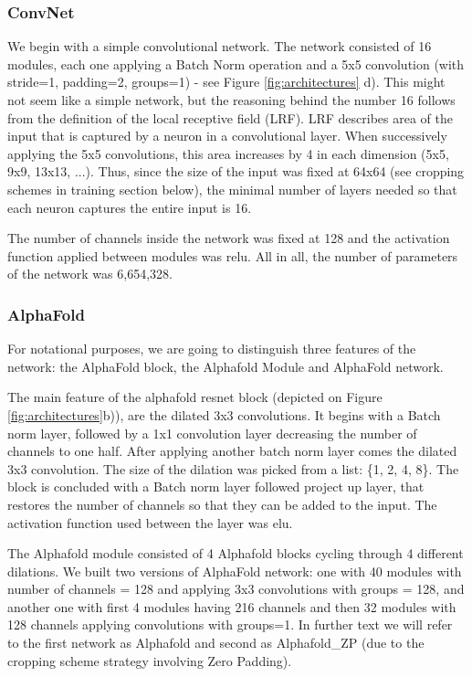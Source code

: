 \subsubsection{ConvNet}

We begin with a simple convolutional network. The network consisted of 16 modules, each one applying a Batch Norm operation and a 5x5 convolution (with stride=1, padding=2, groups=1) - see Figure \ref{fig:architectures} d). This might not seem like a simple network, but the reasoning behind the number 16 follows from the definition of the local receptive field (LRF). LRF describes area of the input that is captured by a neuron in a convolutional layer. When successively applying the 5x5 convolutions, this area increases by 4 in each dimension (5x5, 9x9, 13x13, ...). Thus, since the size of the input was fixed at 64x64 (see cropping schemes in training section below), the minimal number of layers needed so that each neuron captures the entire input is 16.

The number of channels inside the network was fixed at 128 and the activation function applied between modules was relu. All in all, the number of parameters of the network was 6,654,328.

\subsubsection{AlphaFold}

For notational purposes, we are going to distinguish three features of the network: the AlphaFold block, the Alphafold Module and AlphaFold network.

The main feature of the alphafold resnet block (depicted on Figure \ref{fig:architectures}b)), are the dilated 3x3 convolutions. It begins with a Batch norm layer, followed by a 1x1 convolution layer decreasing the number of channels to one half. After applying another batch norm layer comes the dilated 3x3 convolution. The size of the dilation was picked from a list: \{1, 2, 4, 8\}. The block is concluded with a Batch norm layer followed project up layer, that restores the number of channels so that they can be added to the input. The activation function used between the layer was elu.

The Alphafold module consisted of 4 Alphafold blocks cycling through 4 different dilations. We built two versions of AlphaFold network: one with 40 modules with number of channels = 128 and applying 3x3 convolutions with groups = 128, and another one with first 4 modules having 216 channels and then 32 modules with 128 channels applying convolutions with groups=1. In further text we will refer to the first network as Alphafold and second as Alphafold\_ZP (due to the cropping scheme strategy involving Zero Padding). 


